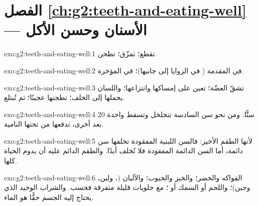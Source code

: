 \section*{الفصل \ref{ch:g2:teeth-and-eating-well} --- الأسنان وحسن الأكل}

\begin{solution}{exo:g2:teeth-and-eating-well:1}
 تقطع؛  تمزّق؛  تطحن.
\end{solution}

\begin{solution}{exo:g2:teeth-and-eating-well:2}
 في المقدمة ( في الزوايا إلى جانبها)؛  في
المؤخرة.
\end{solution}

\begin{solution}{exo:g2:teeth-and-eating-well:3}
 تشقّ العضّة؛  تعين على إمساكها وانتزاعها؛ واللسان
يحملها إلى الخلف؛  تطحنها عجينًا؛ ثم تُبتلع.
\end{solution}

\begin{solution}{exo:g2:teeth-and-eating-well:4}
 $20$ سنًّا. ومن نحو سن السادسة تتخلخل وتسقط واحدة
بعد أخرى، تدفعها من تحتها  النامية.
\end{solution}

\begin{solution}{exo:g2:teeth-and-eating-well:5}
لأنها الطقم الأخير: فالسن اللبنية المفقودة تخلفها سن دائمة، أما
السن الدائمة المفقودة فلا تُخلف أبدًا. والطقم الدائم عليه أن يدوم
الحياة كلها.
\end{solution}

\begin{solution}{exo:g2:teeth-and-eating-well:6}
الفواكه والخضر؛ والخبز والحبوب؛ والألبان (، ولبن، وجبن)؛
واللحم أو السمك أو ؛ مع حلويات قليلة متفرقة فحسب. والشراب
الوحيد الذي يحتاج إليه الجسم حقًّا هو الماء.
\end{solution}

